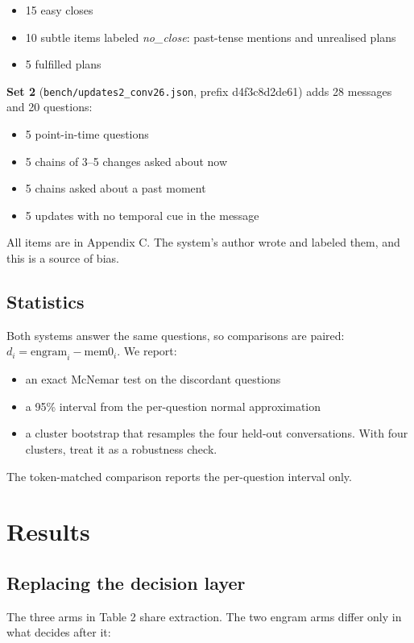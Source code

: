 \documentclass[11pt]{article}
\newcommand{\src}[1]{}
\begin{document}
\begin{itemize}
\item 15\src{bench/updates_conv26.json} easy closes
\item 10\src{bench/updates_conv26.json} subtle items labeled \emph{no\_close}: past-tense mentions and unrealised plans
\item 5\src{bench/updates_conv26.json} fulfilled plans
\end{itemize}
\textbf{Set 2} (\texttt{bench/updates2\_\allowbreak{}conv26.json}, prefix d4f3c8d2de61\src{bench/updates2_conv26.json}) adds 28\src{bench/updates2_conv26.json} messages and 20\src{bench/updates2_conv26.json} questions:

\begin{itemize}
\item 5\src{bench/updates2_conv26.json} point-in-time questions
\item 5\src{bench/updates2_conv26.json} chains of 3--5 changes asked about now
\item 5\src{bench/updates2_conv26.json} chains asked about a past moment
\item 5\src{bench/updates2_conv26.json} updates with no temporal cue in the message
\end{itemize}
All items are in Appendix C. The system's author wrote and labeled them, and this is a source of bias.

\subsection{Statistics}
Both systems answer the same questions, so comparisons are paired: $d_i = \text{engram}_i - \text{mem0}_i$. We report:

\begin{itemize}
\item an exact McNemar test on the discordant questions
\item a 95\% interval from the per-question normal approximation
\item a cluster bootstrap that resamples the four held-out conversations. With four clusters, treat it as a robustness check.
\end{itemize}
The token-matched comparison reports the per-question interval only.

\section{Results}
\subsection{Replacing the decision layer}
The three arms in Table 2 share extraction. The two engram arms differ only in what decides after it:
\end{document}
